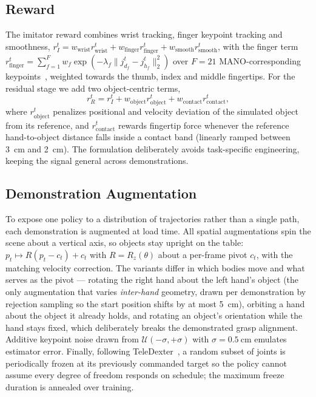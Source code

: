 \documentclass[letterpaper, 10 pt, conference]{ieeeconf}
\begin{document}
\subsection{Reward}

The imitator reward combines wrist tracking, finger keypoint tracking and smoothness,
$r^t_I = w_\mathrm{wrist} r^t_\mathrm{wrist} + w_\mathrm{finger} r^t_\mathrm{finger} +
w_\mathrm{smooth} r^t_\mathrm{smooth}$, with the finger term
$r^t_\mathrm{finger} = \sum_{f=1}^{F} w_f \exp(-\lambda_f \|j^t_{d_f} - j^t_{h_f}\|_2^2)$
over $F = 21$ MANO-corresponding keypoints~\cite{mano}, weighted towards the thumb,
index and middle fingertips. For the residual stage we add two object-centric terms,
\begin{equation}
    r^t_R = r^t_I + w_\mathrm{object} r^t_\mathrm{object} +
    w_\mathrm{contact} r^t_\mathrm{contact},
\end{equation}
where $r^t_\mathrm{object}$ penalizes positional and velocity deviation of the simulated
object from its reference, and $r^t_\mathrm{contact}$ rewards fingertip force whenever
the reference hand-to-object distance falls inside a contact band (linearly ramped
between \SI{3}{\centi\meter} and \SI{2}{\centi\meter}). The formulation deliberately
avoids task-specific engineering, keeping the signal general across demonstrations.

\subsection{Demonstration Augmentation}

To expose one policy to a distribution of trajectories rather than a single path, each
demonstration is augmented at load time. All spatial augmentations spin the scene about
a vertical axis, so objects stay upright on the table: $p_t \mapsto R(p_t - c_t) + c_t$
with $R = R_z(\theta)$ about a per-frame pivot $c_t$, with the matching velocity
correction. The variants differ in which bodies move and what serves as the pivot ---
rotating the right hand about the left hand's object (the only augmentation that varies
\emph{inter-hand} geometry, drawn per demonstration by rejection sampling so the start
position shifts by at most \SI{5}{\centi\meter}), orbiting a hand about the object it
already holds, and rotating an object's orientation while the hand stays fixed, which
deliberately breaks the demonstrated grasp alignment. Additive keypoint noise drawn from
$\mathcal{U}(-\sigma, +\sigma)$ with $\sigma = \SI{0.5}{\centi\meter}$ emulates
estimator error. Finally, following TeleDexter~\cite{teledexter}, a random subset of
joints is periodically frozen at its previously commanded target so the policy cannot
assume every degree of freedom responds on schedule; the maximum freeze duration is
annealed over training.
\end{document}
